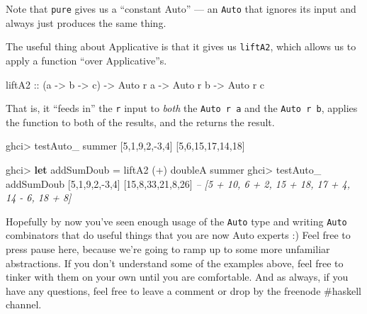 \documentclass[]{article}
\newenvironment{Shaded}{}{}
\newcommand{\KeywordTok}[1]{\textcolor[rgb]{0.00,0.44,0.13}{\textbf{{#1}}}}
\newcommand{\DataTypeTok}[1]{\textcolor[rgb]{0.56,0.13,0.00}{{#1}}}
\newcommand{\DecValTok}[1]{\textcolor[rgb]{0.25,0.63,0.44}{{#1}}}
\newcommand{\CommentTok}[1]{\textcolor[rgb]{0.38,0.63,0.69}{\textit{{#1}}}}
\newcommand{\OtherTok}[1]{\textcolor[rgb]{0.00,0.44,0.13}{{#1}}}
\newcommand{\FunctionTok}[1]{\textcolor[rgb]{0.02,0.16,0.49}{{#1}}}
\newcommand{\NormalTok}[1]{{#1}}
\begin{document}
Note that \texttt{pure} gives us a ``constant Auto'' --- an
\texttt{Auto} that ignores its input and always just produces the same
thing.

The useful thing about Applicative is that it gives us \texttt{liftA2},
which allows us to apply a function ``over Applicative''s.

\begin{Shaded}
\begin{Highlighting}[]
\OtherTok{liftA2 ::} \NormalTok{(a }\OtherTok{->} \NormalTok{b }\OtherTok{->} \NormalTok{c) }\OtherTok{->} \DataTypeTok{Auto} \NormalTok{r a }\OtherTok{->} \DataTypeTok{Auto} \NormalTok{r b }\OtherTok{->} \DataTypeTok{Auto} \NormalTok{r c}
\end{Highlighting}
\end{Shaded}

That is, it ``feeds in'' the \texttt{r} input to \emph{both} the
\texttt{Auto\ r\ a} and the \texttt{Auto\ r\ b}, applies the function to
both of the results, and the returns the result.

\begin{Shaded}
\begin{Highlighting}[]
\NormalTok{ghci}\FunctionTok{>} \NormalTok{testAuto_ summer [}\DecValTok{5}\NormalTok{,}\DecValTok{1}\NormalTok{,}\DecValTok{9}\NormalTok{,}\DecValTok{2}\NormalTok{,}\FunctionTok{-}\DecValTok{3}\NormalTok{,}\DecValTok{4}\NormalTok{]}
\NormalTok{[}\DecValTok{5}\NormalTok{,}\DecValTok{6}\NormalTok{,}\DecValTok{15}\NormalTok{,}\DecValTok{17}\NormalTok{,}\DecValTok{14}\NormalTok{,}\DecValTok{18}\NormalTok{]}

\NormalTok{ghci}\FunctionTok{>} \KeywordTok{let} \NormalTok{addSumDoub }\FunctionTok{=} \NormalTok{liftA2 (}\FunctionTok{+}\NormalTok{) doubleA summer}
\NormalTok{ghci}\FunctionTok{>} \NormalTok{testAuto_ addSumDoub [}\DecValTok{5}\NormalTok{,}\DecValTok{1}\NormalTok{,}\DecValTok{9}\NormalTok{,}\DecValTok{2}\NormalTok{,}\FunctionTok{-}\DecValTok{3}\NormalTok{,}\DecValTok{4}\NormalTok{]}
\NormalTok{[}\DecValTok{15}\NormalTok{,}\DecValTok{8}\NormalTok{,}\DecValTok{33}\NormalTok{,}\DecValTok{21}\NormalTok{,}\DecValTok{8}\NormalTok{,}\DecValTok{26}\NormalTok{]}
\CommentTok{-- [5 + 10, 6 + 2, 15 + 18, 17 + 4, 14 - 6, 18 + 8]}
\end{Highlighting}
\end{Shaded}

Hopefully by now you've seen enough usage of the \texttt{Auto} type and
writing \texttt{Auto} combinators that do useful things that you are now
Auto experts :) Feel free to press pause here, because we're going to
ramp up to some more unfamiliar abstractions. If you don't understand
some of the examples above, feel free to tinker with them on your own
until you are comfortable. And as always, if you have any questions,
feel free to leave a comment or drop by the freenode \#haskell channel.
\end{document}
